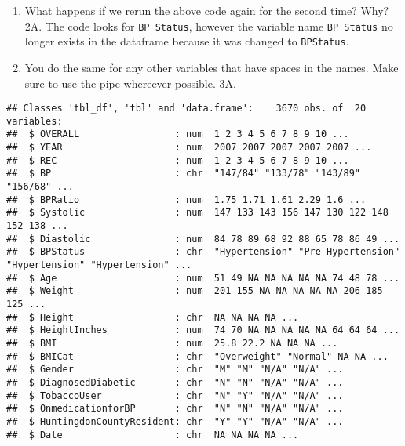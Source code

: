 \documentclass[
]{article}
\newenvironment{Shaded}{\begin{snugshade}}{\end{snugshade}}
\newcommand{\DataTypeTok}[1]{\textcolor[rgb]{0.13,0.29,0.53}{#1}}
\newcommand{\KeywordTok}[1]{\textcolor[rgb]{0.13,0.29,0.53}{\textbf{#1}}}
\newcommand{\NormalTok}[1]{#1}
\newcommand{\OperatorTok}[1]{\textcolor[rgb]{0.81,0.36,0.00}{\textbf{#1}}}
\newcommand{\StringTok}[1]{\textcolor[rgb]{0.31,0.60,0.02}{#1}}
\begin{document}
\begin{enumerate}
\def\labelenumi{\arabic{enumi}.}
\setcounter{enumi}{1}
\item
  What happens if we rerun the above code again for the second time?
  Why? 2A. The code looks for \texttt{BP\ Status}, however the variable
  name \texttt{BP\ Status} no longer exists in the dataframe because it
  was changed to \texttt{BPStatus}.
\item
  You do the same for any other variables that have spaces in the names.
  Make sure to use the pipe whereever possible. 3A.
\end{enumerate}

\begin{Shaded}
\end{Shaded}

\begin{verbatim}
## Classes 'tbl_df', 'tbl' and 'data.frame':    3670 obs. of  20 variables:
##  $ OVERALL                 : num  1 2 3 4 5 6 7 8 9 10 ...
##  $ YEAR                    : num  2007 2007 2007 2007 2007 ...
##  $ REC                     : num  1 2 3 4 5 6 7 8 9 10 ...
##  $ BP                      : chr  "147/84" "133/78" "143/89" "156/68" ...
##  $ BPRatio                 : num  1.75 1.71 1.61 2.29 1.6 ...
##  $ Systolic                : num  147 133 143 156 147 130 122 148 152 138 ...
##  $ Diastolic               : num  84 78 89 68 92 88 65 78 86 49 ...
##  $ BPStatus                : chr  "Hypertension" "Pre-Hypertension" "Hypertension" "Hypertension" ...
##  $ Age                     : num  51 49 NA NA NA NA NA 74 48 78 ...
##  $ Weight                  : num  201 155 NA NA NA NA NA 206 185 125 ...
##  $ Height                  : chr  NA NA NA NA ...
##  $ HeightInches            : num  74 70 NA NA NA NA NA 64 64 64 ...
##  $ BMI                     : num  25.8 22.2 NA NA NA ...
##  $ BMICat                  : chr  "Overweight" "Normal" NA NA ...
##  $ Gender                  : chr  "M" "M" "N/A" "N/A" ...
##  $ DiagnosedDiabetic       : chr  "N" "N" "N/A" "N/A" ...
##  $ TobaccoUser             : chr  "N" "Y" "N/A" "N/A" ...
##  $ OnmedicationforBP       : chr  "N" "N" "N/A" "N/A" ...
##  $ HuntingdonCountyResident: chr  "Y" "Y" "N/A" "N/A" ...
##  $ Date                    : chr  NA NA NA NA ...
\end{verbatim}
\end{document}
